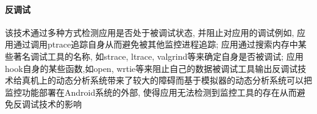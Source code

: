 \paragraph*{反调试}
该技术通过多种方式检测应用是否处于被调试状态, 并阻止对应用的调试\juhao 例如, 应用通过调用ptrace追踪自身从而避免被其他监控进程追踪; 应用通过搜索内存中某些著名调试工具的名称, 如strace, ltrace, valgrind等来确定自身是否被调试; 应用hook自身的某些函数,如open, wrtie等来阻止自己的数据被调试工具输出\juhao 反调试技术给真机上的动态分析系统带来了较大的障碍而基于模拟器的动态分析系统可以把监控功能部署在Android系统的外部, 使得应用无法检测到监控工具的存在从而避免反调试技术的影响\juhao 




